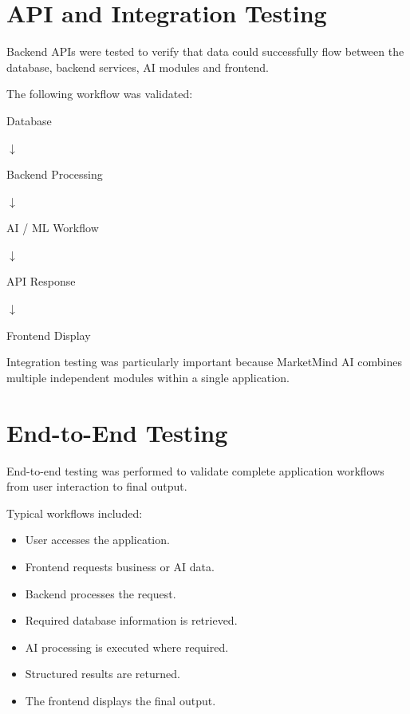 \documentclass[12pt,a4paper]{report}
\begin{document}

\section{API and Integration Testing}

Backend APIs were tested to verify that data could successfully flow
between the database, backend services, AI modules and frontend.

The following workflow was validated:

\begin{center}

Database

$\downarrow$

Backend Processing

$\downarrow$

AI / ML Workflow

$\downarrow$

API Response

$\downarrow$

Frontend Display

\end{center}

Integration testing was particularly important because MarketMind AI
combines multiple independent modules within a single application.



\section{End-to-End Testing}

End-to-end testing was performed to validate complete application
workflows from user interaction to final output.

Typical workflows included:

\begin{itemize}
    \item User accesses the application.
    \item Frontend requests business or AI data.
    \item Backend processes the request.
    \item Required database information is retrieved.
    \item AI processing is executed where required.
    \item Structured results are returned.
    \item The frontend displays the final output.
\end{itemize}
\end{document}
